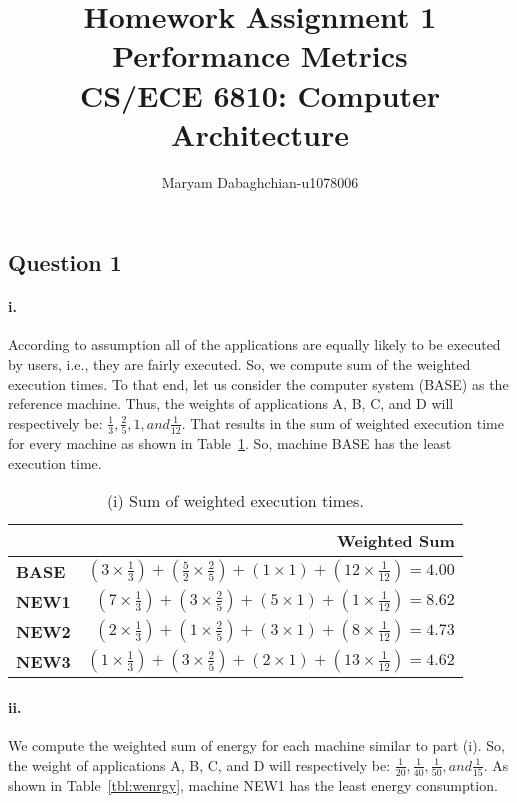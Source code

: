 \documentclass[12pt]{article}
\title{Homework Assignment 1\\
	Performance Metrics\\
	CS/ECE 6810: Computer Architecture}
\author{Maryam Dabaghchian-u1078006}
\newcommand{\q}[1]{\subsection*{Question {#1}}}
\renewcommand{\part}[1]{\paragraph*{{#1}.}}
\begin{document}
\maketitle

\q{1} 

\part{i} According to assumption all of the applications are equally likely to be 
executed by users, i.e., they are fairly executed. So, we compute sum of the 
weighted execution times. To that end, let us consider the computer system (BASE) 
as the reference machine. Thus, the weights of applications A, B, C, and D will 
respectively be: $\frac{1}{3}, \frac{2}{5}, 1, and \frac{1}{12}$. That results in 
the sum of weighted execution time for every machine as shown in 
Table~\ref{tbl:wext}. So, machine BASE has the least execution time. 

\begin{table}[h]
\center
\begin{tabular}{|l|r|}
	\hline
	 & \textbf{Weighted Sum} \\
	\hline
	\textbf{BASE} & $(3 \times \frac{1}{3}) + (\frac{5}{2} \times \frac{2}{5}) + 
	(1 \times 1) + (12 \times \frac{1}{12}) = 4.00$  \\
	\hline
	\textbf{NEW1} & $(7 \times \frac{1}{3}) + (3 \times \frac{2}{5}) + 
	(5 \times 1) + (1 \times \frac{1}{12}) = 8.62$ \\
	\hline
	\textbf{NEW2} & $(2 \times \frac{1}{3}) + (1 \times \frac{2}{5}) + 
	(3 \times 1) + (8 \times \frac{1}{12}) = 4.73$ \\
	\hline
	\textbf{NEW3} & $(1 \times \frac{1}{3}) + (3 \times \frac{2}{5}) + 
	(2 \times 1) + (13 \times \frac{1}{12}) = 4.62$ \\
	\hline
\end{tabular}
\caption{(i) Sum of weighted execution times.}
\label{tbl:wext}
\end{table}


\part{ii} We compute the weighted sum of energy for each machine similar to 
part (i). So, the weight of applications A, B, C, and D will respectively be: 
$\frac{1}{20}, \frac{1}{40}, \frac{1}{50}, and \frac{1}{15}$. As shown in 
Table~\ref{tbl:wenrgy}, machine NEW1 has the least energy consumption.
\end{document}
